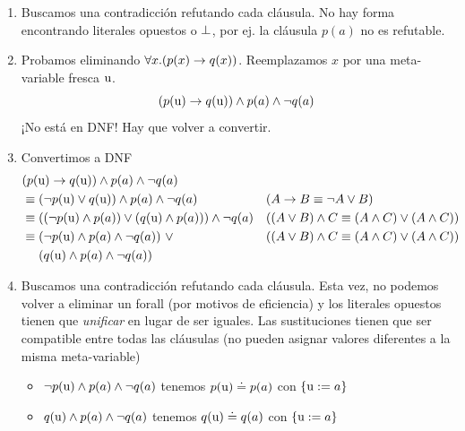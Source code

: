 \begin{ejemplo}
\begin{enumerate}
        \item Buscamos una contradicción refutando cada cláusula. No hay forma
        encontrando literales opuestos o $\bot$, por ej. la cláusula
        $p(a)$ no es refutable.
        \item Probamos eliminando $\forall x. (p(x) \to q(x))$. Reemplazamos
        $x$ por una meta-variable fresca $\textrm{u}$.
        \[
            (p(\textrm{u}) \to q(\textrm{u})) \wedge p(a) \wedge \neg q(a)
        \]
        ¡No está en DNF! Hay que volver a convertir.
        \item Convertimos a DNF
        \begin{align*}
            &(p(\metavar{u}) \fImp q(\metavar{u})) \fAnd p(a) \fAnd \fNot q(a)\\
            &\equiv (\fNot p(\metavar{u}) \fOr q(\metavar{u})) \fAnd p(a) \fAnd \fNot q(a)
            &&(\form \to \formTwo \equiv \fNot \form \fOr \formTwo)\\
            &\equiv ( (\fNot p(\metavar{u}) \fAnd p(a)) \fOr (q(\metavar{u}) \fAnd p(a))) \fAnd \fNot q(a)
            &&((\form \fOr \formTwo) \fAnd \formThree \equiv (\form \fAnd \formThree) \fOr (\form \fAnd \formThree))\\
            &\equiv 
            \begin{aligned}[t]
                &(\fNot p(\metavar{u}) \fAnd p(a) \fAnd \fNot q(a))\ \fOr\\
                &(q(\metavar{u}) \fAnd p(a)\fAnd \fNot q(a))
            \end{aligned}
            &&((\form \fOr \formTwo) \fAnd \formThree \equiv (\form \fAnd \formThree) \fOr (\form \fAnd \formThree))
        \end{align*}
        \item Buscamos una contradicción refutando cada cláusula. Esta vez, no
        podemos volver a eliminar un forall (por motivos de eficiencia) y los
        literales opuestos tienen que \textit{unificar} en lugar de ser iguales.
        Las sustituciones tienen que ser compatible entre todas las cláusulas
        (no pueden asignar valores diferentes a la misma meta-variable)
        \begin{itemize}
            \item $\neg p(\textrm{u}) \wedge p(a) \wedge \neg q(a)$ tenemos $p(\textrm{u}) \doteq p(a)$ con $\{\textrm{u} := a\}$
            \item $q(\textrm{u}) \wedge p(a) \wedge \neg q(a)$ tenemos $q(\textrm{u}) \doteq q(a)$ con $\{\textrm{u} := a\}$
        \end{itemize}
    \end{enumerate}
\end{ejemplo}

